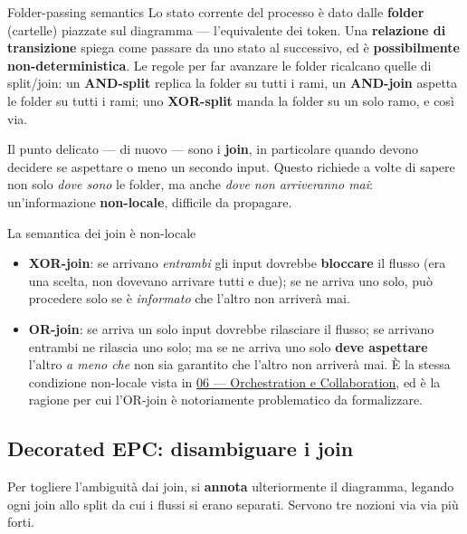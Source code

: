 \begin{boxdefinition}{Folder-passing semantics}
Lo stato corrente del processo è dato dalle \textbf{folder} (cartelle) piazzate sul diagramma — l'equivalente dei token. Una \textbf{relazione di transizione} spiega come passare da uno stato al successivo, ed è \textbf{possibilmente non-deterministica}. Le regole per far avanzare le folder ricalcano quelle di split/join: un \textbf{AND-split} replica la folder su tutti i rami, un \textbf{AND-join} aspetta le folder su tutti i rami; uno \textbf{XOR-split} manda la folder su un solo ramo, e così via.
\end{boxdefinition}

Il punto delicato — di nuovo — sono i \textbf{join}, in particolare quando devono decidere se aspettare o meno un secondo input. Questo richiede a volte di sapere non solo \emph{dove sono} le folder, ma anche \emph{dove non arriveranno mai}: un'informazione \textbf{non-locale}, difficile da propagare.

\begin{boxwarning}{La semantica dei join è non-locale}
\begin{itemize}
\item \textbf{XOR-join}: se arrivano \emph{entrambi} gli input dovrebbe \textbf{bloccare} il flusso (era una scelta, non dovevano arrivare tutti e due); se ne arriva uno solo, può procedere solo se è \emph{informato} che l'altro non arriverà mai.
\item \textbf{OR-join}: se arriva un solo input dovrebbe rilasciare il flusso; se arrivano entrambi ne rilascia uno solo; ma se ne arriva uno solo \textbf{deve aspettare} l'altro \emph{a meno che} non sia garantito che l'altro non arriverà mai. È la stessa condizione non-locale vista in \hyperref[ch:06]{06 — Orchestration e Collaboration}, ed è la ragione per cui l'OR-join è notoriamente problematico da formalizzare.
\end{itemize}
\end{boxwarning}

\subsection{\texorpdfstring{Decorated EPC: disambiguare i join}{Decorated EPC: disambiguare i join}}

Per togliere l'ambiguità dai join, si \textbf{annota} ulteriormente il diagramma, legando ogni join allo split da cui i flussi si erano separati. Servono tre nozioni via via più forti.

